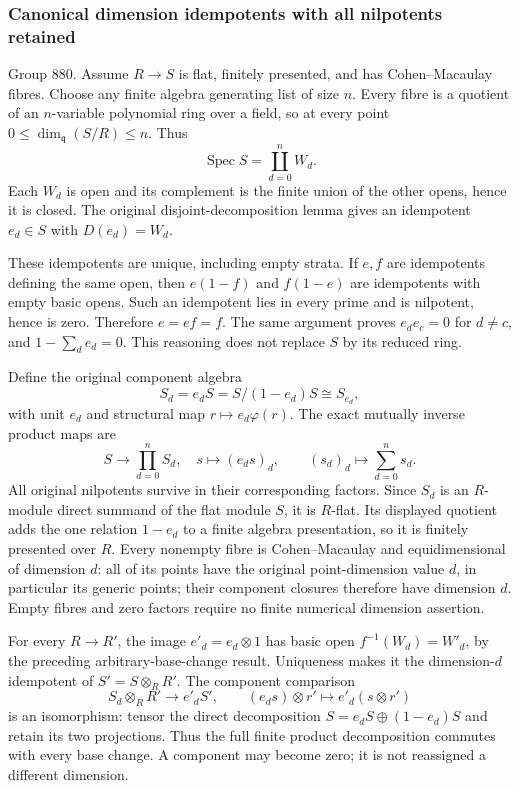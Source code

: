 \subsubsection{Canonical dimension idempotents with all nilpotents retained}\label{algebra-proof-040-canonical-dimension-idempotents-with-all-nilpotents-retained}

Group 880. Assume \(R\to S\) is flat, finitely presented, and has Cohen--Macaulay fibres. Choose any finite algebra generating list of size \(n\). Every fibre is a quotient of an \(n\)-variable polynomial ring over a field, so at every point \(0\leq\dim_{\mathfrak q}(S/R)\leq n\). Thus \[
\operatorname{Spec}S=\coprod_{d=0}^n W_d .
\] Each \(W_d\) is open and its complement is the finite union of the other opens, hence it is closed. The original disjoint-decomposition lemma gives an idempotent \(e_d\in S\) with \(D(e_d)=W_d\).

These idempotents are unique, including empty strata. If \(e,f\) are idempotents defining the same open, then \(e(1-f)\) and \(f(1-e)\) are idempotents with empty basic opens. Such an idempotent lies in every prime and is nilpotent, hence is zero. Therefore \(e=ef=f\). The same argument proves \(e_de_c=0\) for \(d\ne c\), and \(1-\sum_d e_d=0\). This reasoning does not replace \(S\) by its reduced ring.

Define the original component algebra \[
S_d=e_dS=S/(1-e_d)S\cong S_{e_d},
\] with unit \(e_d\) and structural map \(r\mapsto e_d\varphi(r)\). The exact mutually inverse product maps are \[
S\longrightarrow\prod_{d=0}^nS_d,\quad s\longmapsto(e_ds)_d,
\qquad
(s_d)_d\longmapsto\sum_{d=0}^n s_d.
\] All original nilpotents survive in their corresponding factors. Since \(S_d\) is an \(R\)-module direct summand of the flat module \(S\), it is \(R\)-flat. Its displayed quotient adds the one relation \(1-e_d\) to a finite algebra presentation, so it is finitely presented over \(R\). Every nonempty fibre is Cohen--Macaulay and equidimensional of dimension \(d\): all of its points have the original point-dimension value \(d\), in particular its generic points; their component closures therefore have dimension \(d\). Empty fibres and zero factors require no finite numerical dimension assertion.

For every \(R\to R'\), the image \(e'_d=e_d\otimes1\) has basic open \(f^{-1}(W_d)=W'_d\), by the preceding arbitrary-base-change result. Uniqueness makes it the dimension-\(d\) idempotent of \(S'=S\otimes_R R'\). The component comparison \[
S_d\otimes_R R'\longrightarrow e'_dS',
\qquad (e_ds)\otimes r'\longmapsto e'_d(s\otimes r')
\] is an isomorphism: tensor the direct decomposition \(S=e_dS\oplus(1-e_d)S\) and retain its two projections. Thus the full finite product decomposition commutes with every base change. A component may become zero; it is not reassigned a different dimension.

